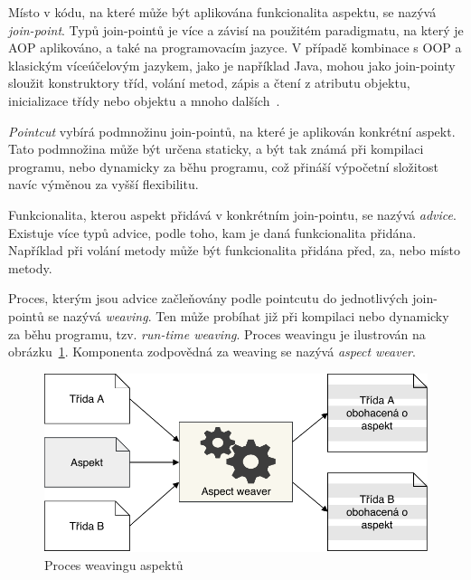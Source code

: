 Místo v kódu, na které může být aplikována funkcionalita aspektu, se nazývá
\textit{join-point}. Typů join-pointů je více a závisí na použitém paradigmatu,
na který je \gls{AOP} aplikováno, a také na programovacím jazyce. V případě
kombinace s \gls{OOP} a klasickým víceúčelovým jazykem, jako je například Java,
mohou jako join-pointy sloužit konstruktory tříd, volání metod, zápis a čtení
z atributu objektu, inicializace třídy nebo objektu a mnoho dalších~\cite{laddad2003aspectj}.

\textit{Pointcut} vybírá podmnožinu join-pointů, na které je aplikován konkrétní aspekt.
Tato podmnožina může být určena staticky, a být tak známá při kompilaci programu, nebo
dynamicky za běhu programu, což přináší výpočetní složitost navíc výměnou
za vyšší flexibilitu.

Funkcionalita, kterou aspekt přidává v konkrétním join-pointu, se nazývá
\textit{advice}. Existuje více typů advice, podle toho, kam je
daná funkcionalita přidána. Například při volání metody může
být funkcionalita přidána před, za, nebo místo metody.

Proces, kterým jsou advice začleňovány podle pointcutu do
jednotlivých join-pointů se nazývá \textit{weaving}. Ten může
probíhat již při kompilaci nebo dynamicky za běhu programu,
tzv. \textit{run-time weaving}. Proces weavingu je ilustrován
na obrázku~\ref{fig:aspect-weaving}. Komponenta zodpovědná za
weaving se nazývá \textit{aspect weaver}.

\begin{figure}[t]
    \centering
    \includegraphics[keepaspectratio=true, width=0.7\linewidth]{figures/aspect-weaving.pdf}
    \caption{Proces weavingu aspektů}
    \label{fig:aspect-weaving}
\end{figure}


